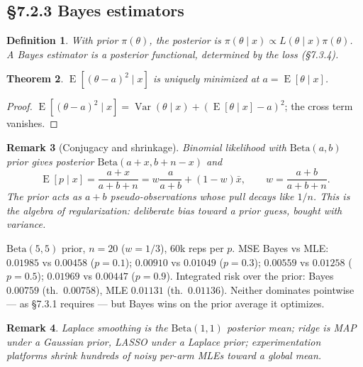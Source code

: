 \documentclass[11pt]{article}
\newtheorem{theorem}{Theorem}[section]
\newtheorem{definition}[theorem]{Definition}
\newtheorem{remark}[theorem]{Remark}
\DeclareMathOperator{\Var}{Var}\DeclareMathOperator{\Cov}{Cov}\DeclareMathOperator{\E}{E}
\begin{document}
\subsection{\S7.2.3 Bayes estimators}
\begin{definition}
With prior $\pi(\theta)$, the posterior is $\pi(\theta\mid x)\propto L(\theta\mid x)\pi(\theta)$. A Bayes estimator is a posterior functional, determined by the loss (\S7.3.4).
\end{definition}
\begin{theorem}
$\E[(\theta-a)^2\mid x]$ is uniquely minimized at $a=\E[\theta\mid x]$.
\end{theorem}
\begin{proof}
$\E[(\theta-a)^2\mid x]=\Var(\theta\mid x)+(\E[\theta\mid x]-a)^2$; the cross term vanishes.
\end{proof}
\begin{remark}[Conjugacy and shrinkage]
Binomial likelihood with $\mathrm{Beta}(a,b)$ prior gives posterior $\mathrm{Beta}(a+x,b+n-x)$ and
\[\E[p\mid x]=\frac{a+x}{a+b+n}=w\frac{a}{a+b}+(1-w)\bar x,\qquad w=\frac{a+b}{a+b+n}.\]
The prior acts as $a+b$ pseudo-observations whose pull decays like $1/n$. This is the algebra of regularization: deliberate bias toward a prior guess, bought with variance.
\end{remark}
\begin{simbox}
$\mathrm{Beta}(5,5)$ prior, $n=20$ ($w=1/3$), 60k reps per $p$. MSE Bayes vs MLE: $0.01985$ vs $0.00458$ ($p=0.1$); $0.00910$ vs $0.01049$ ($p=0.3$); $0.00559$ vs $0.01258$ ($p=0.5$); $0.01969$ vs $0.00447$ ($p=0.9$). Integrated risk over the prior: Bayes $0.00759$ (th.\ $0.00758$), MLE $0.01131$ (th.\ $0.01136$). Neither dominates pointwise --- as \S7.3.1 requires --- but Bayes wins on the prior average it optimizes.
\end{simbox}
\begin{remark}
Laplace smoothing is the $\mathrm{Beta}(1,1)$ posterior mean; ridge is MAP under a Gaussian prior, LASSO under a Laplace prior; experimentation platforms shrink hundreds of noisy per-arm MLEs toward a global mean.
\end{remark}
\end{document}
